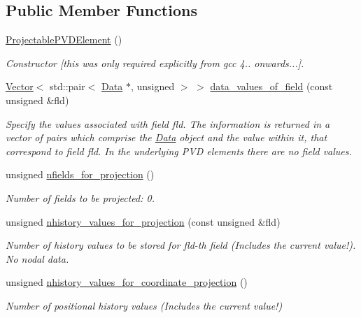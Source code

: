 \subsection*{Public Member Functions}
\begin{DoxyCompactItemize}
\item 
\hyperlink{classoomph_1_1ProjectablePVDElement_aa34288da3b895e1900bd3d1dd509ae39}{Projectable\+P\+V\+D\+Element} ()
\begin{DoxyCompactList}\small\item\em Constructor \mbox{[}this was only required explicitly from gcc 4.. onwards...\mbox{]}. \end{DoxyCompactList}\item 
\hyperlink{classoomph_1_1Vector}{Vector}$<$ std\+::pair$<$ \hyperlink{classoomph_1_1Data}{Data} $\ast$, unsigned $>$ $>$ \hyperlink{classoomph_1_1ProjectablePVDElement_ab786e3176fd618064e5cb35557dc01fe}{data\+\_\+values\+\_\+of\+\_\+field} (const unsigned \&fld)
\begin{DoxyCompactList}\small\item\em Specify the values associated with field fld. The information is returned in a vector of pairs which comprise the \hyperlink{classoomph_1_1Data}{Data} object and the value within it, that correspond to field fld. In the underlying P\+VD elements there are no field values. \end{DoxyCompactList}\item 
unsigned \hyperlink{classoomph_1_1ProjectablePVDElement_a3ef16d41268f4cdb67718a5c2fca3cab}{nfields\+\_\+for\+\_\+projection} ()
\begin{DoxyCompactList}\small\item\em Number of fields to be projected\+: 0. \end{DoxyCompactList}\item 
unsigned \hyperlink{classoomph_1_1ProjectablePVDElement_a1fe76f1370f13c75f81f8dc860240084}{nhistory\+\_\+values\+\_\+for\+\_\+projection} (const unsigned \&fld)
\begin{DoxyCompactList}\small\item\em Number of history values to be stored for fld-\/th field (Includes the current value!). No nodal data. \end{DoxyCompactList}\item 
unsigned \hyperlink{classoomph_1_1ProjectablePVDElement_a82923f600601aa9f0c9e1b168f0d8fa5}{nhistory\+\_\+values\+\_\+for\+\_\+coordinate\+\_\+projection} ()
\begin{DoxyCompactList}\small\item\em Number of positional history values (Includes the current value!) \end{DoxyCompactList}\item 

\end{DoxyCompactItemize}
